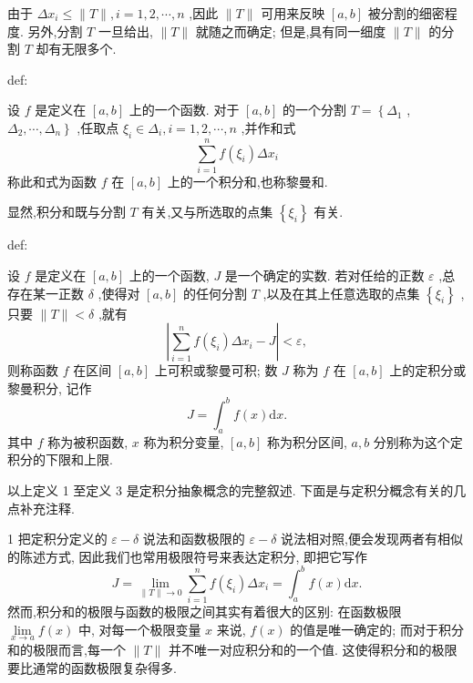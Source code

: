 \begin{remark}

\end{remark}
由于 \(\Delta {x}_{i} \leq  \parallel T\parallel ,i = 1,2,\cdots ,n\) ,因此 \(\parallel T\parallel\) 可用来反映 \(\left\lbrack  {a,b}\right\rbrack\) 被分割的细密程度. 另外,分割 \(T\) 一旦给出, \(\parallel T\parallel\) 就随之而确定; 但是,具有同一细度 \(\parallel T\parallel\) 的分割 \(T\) 却有无限多个.

\begin{definition}{}{def:}

\end{definition}
设 \(f\) 是定义在 \(\left\lbrack  {a,b}\right\rbrack\) 上的一个函数. 对于 \(\left\lbrack  {a,b}\right\rbrack\) 的一个分割 \(T = \left\{  {\Delta }_{1}\right.\) , \(\left. {{\Delta }_{2},\cdots ,{\Delta }_{n}}\right\}\) ,任取点 \({\xi }_{i} \in  {\Delta }_{i},i = 1,2,\cdots ,n\) ,并作和式
\[
\mathop{\sum }\limits_{{i = 1}}^{n}f\left( {\xi }_{i}\right) \Delta {x}_{i}
\]
称此和式为函数 \(f\) 在 \(\left\lbrack  {a,b}\right\rbrack\) 上的一个积分和,也称黎曼和.

显然,积分和既与分割 \(T\) 有关,又与所选取的点集 \(\left\{  {\xi }_{i}\right\}\) 有关.

\begin{definition}{}{def:}

\end{definition}
设 \(f\) 是定义在 \(\left\lbrack  {a,b}\right\rbrack\) 上的一个函数, \(J\) 是一个确定的实数. 若对任给的正数 \(\varepsilon\) ,总存在某一正数 \(\delta\) ,使得对 \(\left\lbrack  {a,b}\right\rbrack\) 的任何分割 \(T\) ,以及在其上任意选取的点集 \(\left\{  {\xi }_{i}\right\}\) ,只要 \(\parallel T\parallel  < \delta\) ,就有
\[
\left| {\mathop{\sum }\limits_{{i = 1}}^{n}f\left( {\xi }_{i}\right) \Delta {x}_{i} - J}\right|  < \varepsilon ,
\]
则称函数 \(f\) 在区间 \(\left\lbrack  {a,b}\right\rbrack\) 上可积或黎曼可积; 数 \(J\) 称为 \(f\) 在 \(\left\lbrack  {a,b}\right\rbrack\) 上的定积分或黎曼积分, 记作
\[
J = {\int }_{a}^{b}f\left( x\right) \mathrm{d}x. \tag{3}
\]
其中 \(f\) 称为被积函数, \(x\) 称为积分变量, \(\left\lbrack  {a,b}\right\rbrack\) 称为积分区间, \(a,b\) 分别称为这个定积分的下限和上限.

以上定义 1 至定义 3 是定积分抽象概念的完整叙述. 下面是与定积分概念有关的几点补充注释.

\begin{remark}

\end{remark}
1 把定积分定义的 \(\varepsilon  - \delta\) 说法和函数极限的 \(\varepsilon  - \delta\) 说法相对照,便会发现两者有相似的陈述方式, 因此我们也常用极限符号来表达定积分, 即把它写作
\[
J = \mathop{\lim }\limits_{{\parallel T\parallel  \rightarrow  0}}\mathop{\sum }\limits_{{i = 1}}^{n}f\left( {\xi }_{i}\right) \Delta {x}_{i} = {\int }_{a}^{b}f\left( x\right) \mathrm{d}x. \tag{4}
\]
然而,积分和的极限与函数的极限之间其实有着很大的区别: 在函数极限 \(\mathop{\lim }\limits_{{x \rightarrow  a}}f\left( x\right)\) 中, 对每一个极限变量 \(x\) 来说, \(f\left( x\right)\) 的值是唯一确定的; 而对于积分和的极限而言,每一个 \(\parallel T\parallel\) 并不唯一对应积分和的一个值. 这使得积分和的极限要比通常的函数极限复杂得多.

